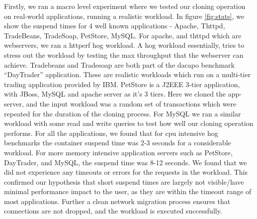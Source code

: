 Firstly, we ran a macro level experiment where we tested our cloning operation on real-world applications, running a realistic workload.
In figure \ref{fig:stats}, we show the suspend times for 4 well known applications - Apache, Thttpd, TradeBeans, TradeSoap, PetStore, MySQL. 
For apache, and thttpd which are webservers, we ran a httperf hog workload. A hog workload essentially, tries to stress out the workload by testing the max throughput that the webserver can achieve.
Tradebeans and Tradesoap are both part of the dacapo\cite{dacapo} benchmark ``DayTrader'' application.
These are realistic workloads which run on a multi-tier trading application provided by IBM. 
PetStore is a J2EEE 3-tier application, with JBoss, MySQL and apache server as it's 3 tiers.
Here we cloned the app-server, and the input workload was a random set of transactions which were repeated for the duration of the cloning process.
For MySQL we ran a similar workload with some read and write queries to test how well our cloning operation performs.
For all the applications, we found that for cpu intensive hog benchmarks the container suspend time was 2-3 seconds for a considerable workload.
For more memory intensive application servers such as PetStore, DayTrader, and MySQL, the suspend time was 8-12 seconds.
We found that we did not experience any timeouts or errors for the requests in the workload. 
This confirmed our hypothesis that short suspend times are largely not visible/have minimal performance impact to the user, as they are within the timeout range of most applications.
Further a clean network migration process ensures that connections are not dropped, and the workload is executed successfully.

